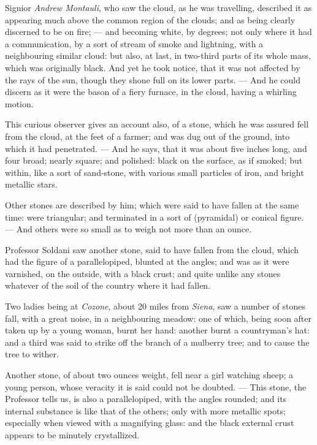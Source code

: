 \documentclass[a4paper, 12pt, oneside]{article}
\begin{document}
Signior \emph{Andrew Montauli}, who saw the cloud, as he was travelling, described it as appearing much above the common region of the clouds; and as being clearly discerned to be on fire; --- and becoming white, by degrees; not only where it had a communication, by a sort of stream of smoke and lightning, with a neighbouring similar cloud: but also, at last, in two-third parts of its whole mass, which was originally black. And yet he took notice, that it was not affected by the rays of the sun, though they shone full on its lower parts. --- And he could discern as it were the bason of a fiery furnace, in the cloud, having a whirling motion.

This curious observer gives an account also, of a stone, which he was assured fell from the cloud, at the feet of a farmer; and was dug out of the ground, into which it had penetrated. --- And he says, that it was about five inches long, and four broad; nearly square; and polished: black on the surface, as if smoked; but within, like a sort of sand-stone, with various small particles of iron, and bright metallic stars.

Other stones are described by him; which were said to have fallen at the same time: were triangular; and terminated in a sort of (pyramidal) or conical figure. --- And others were so small as to weigh not more than an ounce.

Professor Soldani saw another stone, said to have fallen from the cloud, which had the figure of a parallelopiped, blunted at the angles; and was as it were varnished, on the outside, with a black crust; and quite unlike any stones whatever of the soil of the country where it had fallen.

Two ladies being at \emph{Cozone}, about 20 miles from \emph{Siena}, saw a number of stones fall, with a great noise, in a neighbouring meadow: one of which, being soon after taken up by a young woman, burnt her hand: another burnt a countryman's hat: and a third was said to strike off the branch of a mulberry tree; and to cause the tree to wither.

Another stone, of about two ounces weight, fell near a girl watching sheep; a young person, whose veracity it is said could not be doubted. --- This stone, the Professor tells us, is also a parallelopiped, with the angles rounded; and its internal substance is like that of the others; only with more metallic spots; especially when viewed with a magnifying glass: and the black external crust appears to be minutely crystallized.
\end{document}
